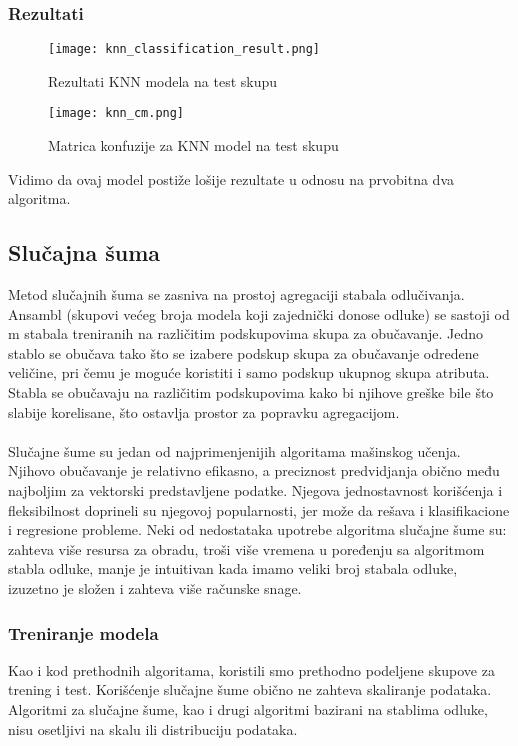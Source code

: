 \documentclass[a4paper,12pt]{article}
\begin{document}
\subsubsection{Rezultati}

\begin{figure}[H]
\centering
\texttt{[image: knn\_classification\_result.png]}
\caption{Rezultati KNN modela na test skupu}
\label{fig:knn_classification_result}
\end{figure}

\begin{figure}[H]
\centering
\texttt{[image: knn\_cm.png]}
\caption{Matrica konfuzije za KNN model na test skupu}
\label{fig:knn_cm}
\end{figure}

Vidimo da ovaj model postiže lošije rezultate u odnosu na prvobitna dva algoritma.

\subsection{Slučajna šuma}
Metod slučajnih šuma se zasniva na prostoj agregaciji stabala odlučivanja. Ansambl (skupovi većeg broja modela koji zajednički donose odluke) se sastoji od m stabala treniranih na različitim podskupovima skupa za obučavanje. Jedno stablo se obučava tako što se izabere podskup skupa za obučavanje odredene veličine, pri čemu je moguće koristiti i samo podskup ukupnog skupa atributa. Stabla se obučavaju na različitim podskupovima kako bi njihove greške bile što slabije korelisane, što ostavlja prostor za popravku agregacijom.
\\\\Slučajne šume su jedan od najprimenjenijih algoritama mašinskog učenja.
Njihovo obučavanje je relativno efikasno, a preciznost predvidjanja obično među
najboljim za vektorski predstavljene podatke. Njegova jednostavnost korišćenja i fleksibilnost doprineli su njegovoj popularnosti, jer može da rešava i klasifikacione i regresione probleme. Neki od nedostataka upotrebe algoritma slučajne šume su: zahteva više resursa za obradu, troši više vremena u poređenju sa algoritmom stabla odluke, manje je intuitivan kada imamo veliki broj stabala odluke, izuzetno je složen i zahteva više računske snage.

\subsubsection{Treniranje modela}
Kao i kod prethodnih algoritama, koristili smo prethodno podeljene skupove za trening i test. Korišćenje slučajne šume obično ne zahteva skaliranje podataka. Algoritmi za slučajne šume, kao i drugi algoritmi bazirani na stablima odluke, nisu osetljivi na skalu ili distribuciju podataka.
\end{document}
